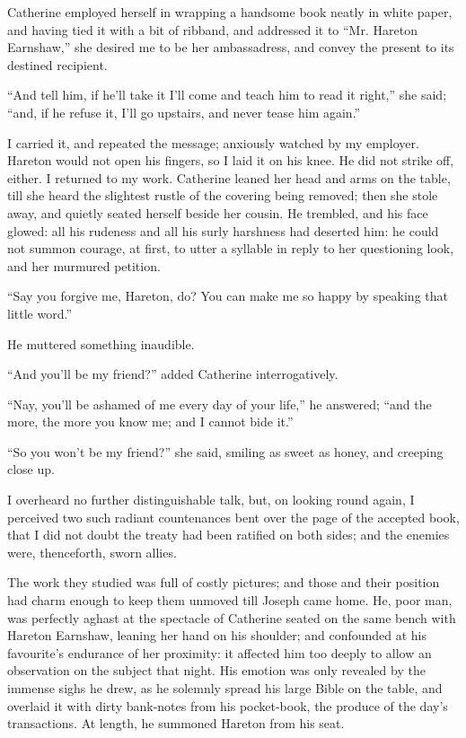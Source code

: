 \par Catherine employed herself in wrapping a handsome book neatly in white paper, and having tied it with a bit of ribband, and addressed it to “Mr. Hareton Earnshaw,” she desired me to be her ambassadress, and convey the present to its destined recipient.
\par “And tell him, if he'll take it I'll come and teach him to read it right,” she said; “and, if he refuse it, I'll go upstairs, and never tease him again.”
\par I carried it, and repeated the message; anxiously watched by my employer. Hareton would not open his fingers, so I laid it on his knee. He did not strike off, either. I returned to my work. Catherine leaned her head and arms on the table, till she heard the slightest rustle of the covering being removed; then she stole away, and quietly seated herself beside her cousin. He trembled, and his face glowed: all his rudeness and all his surly harshness had deserted him: he could not summon courage, at first, to utter a syllable in reply to her questioning look, and her murmured petition.
\par “Say you forgive me, Hareton, do? You can make me so happy by speaking that little word.”
\par He muttered something inaudible.
\par “And you'll be my friend?” added Catherine interrogatively.
\par “Nay, you'll be ashamed of me every day of your life,” he answered; “and the more, the more you know me; and I cannot bide it.”
\par “So you won't be my friend?” she said, smiling as sweet as honey, and creeping close up.
\par I overheard no further distinguishable talk, but, on looking round again, I perceived two such radiant countenances bent over the page of the accepted book, that I did not doubt the treaty had been ratified on both sides; and the enemies were, thenceforth, sworn allies.
\par The work they studied was full of costly pictures; and those and their position had charm enough to keep them unmoved till Joseph came home. He, poor man, was perfectly aghast at the spectacle of Catherine seated on the same bench with Hareton Earnshaw, leaning her hand on his shoulder; and confounded at his favourite's endurance of her proximity: it affected him too deeply to allow an observation on the subject that night. His emotion was only revealed by the immense sighs he drew, as he solemnly spread his large Bible on the table, and overlaid it with dirty bank-notes from his pocket-book, the produce of the day's transactions. At length, he summoned Hareton from his seat.
